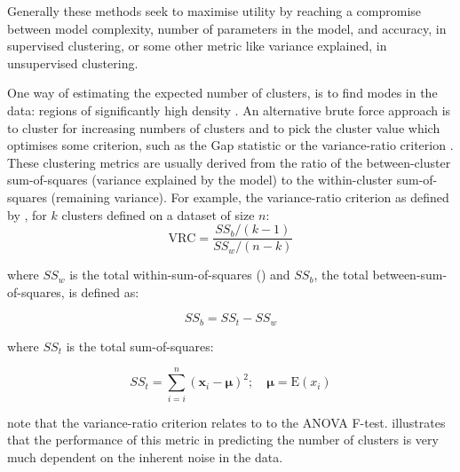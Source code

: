 
Generally these methods seek to maximise utility by reaching a compromise between model complexity, number of parameters in the model,
and accuracy, in supervised clustering, or some other metric like variance explained, in unsupervised clustering.

One way of estimating the expected number of clusters, is to find modes in the data: regions of significantly high density \citep{Duong:2008eu,JING:2012ek}.
An alternative brute force approach is to cluster for increasing numbers of clusters 
and to pick the cluster value which optimises some criterion, such as the Gap statistic \citep{Tibshirani:2001fj}
or the variance-ratio criterion \citep{Calinski:1974bt}.
These clustering metrics are usually derived from the ratio of the between-cluster sum-of-squares (variance explained by the model)
to the within-cluster sum-of-squares (remaining variance).
For example, the variance-ratio criterion as defined by \citet{Calinski:1974bt}, for $k$ clusters defined on a dataset of size $n$:
\[
  \text{VRC} = \frac{SS_{b}/(k-1)}{SS_{w}/(n-k)}
\]

where $SS_{w}$ is the total within-sum-of-squares () and $SS_{b}$, the total between-sum-of-squares, is defined as:

\[
   SS_{b} = SS_{t} - SS_{w}
\]

where $SS_{t}$ is the total sum-of-squares:

\[
  SS_{t} = \sum_{i=i}^{n} ( \mathbf x_i - \boldsymbol\mu )^2 ; \quad \boldsymbol\mu=\text{E}(x_i)
\]

\citeauthor{Calinski:1974bt}  note that the variance-ratio criterion relates to
to the \gls{ANOVA} F-test.
 illustrates that the performance of this metric in predicting the number of clusters
is very much dependent on the inherent noise in the data.



